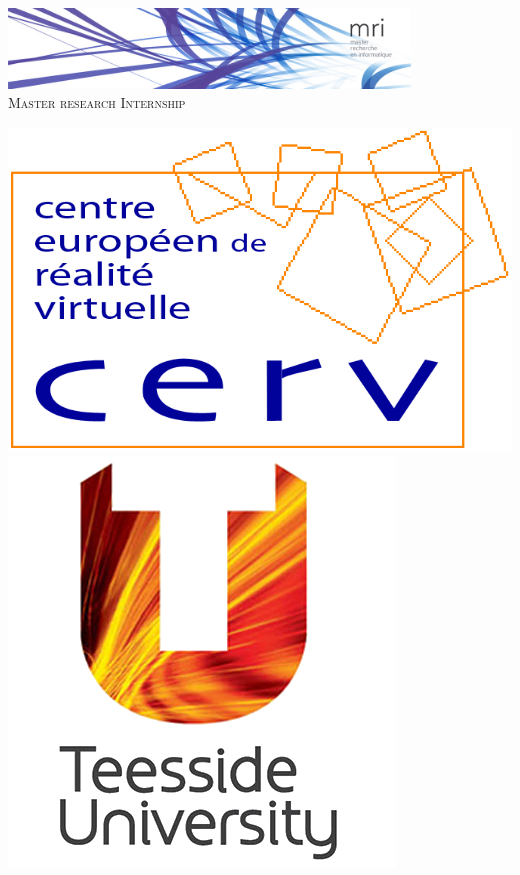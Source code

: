 \documentclass[11pt]{article}
\begin{document}
\begin{titlepage}

\begin{center}


 

\includegraphics[width=0.8\textwidth]{./header}\\[1cm]
\textsc{\Large Master research Internship}
\vspace{1cm}

\includegraphics[height=0.1\textheight]{./logos/cerv_2}
\includegraphics[height=0.1\textheight]{./logos/teeside}

\end{center}
\end{titlepage}
\end{document}
